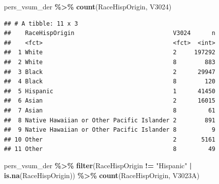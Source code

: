 \documentclass[
]{krantz}
\makeatletter
\newenvironment{Shaded}{\begin{snugshade}}{\end{snugshade}}
\newcommand{\FunctionTok}[1]{\textcolor[rgb]{0.27,0.27,0.27}{\textbf{#1}}}
\newcommand{\NormalTok}[1]{#1}
\newcommand{\SpecialCharTok}[1]{\textcolor[rgb]{0.43,0.43,0.43}{\textbf{#1}}}
\newcommand{\StringTok}[1]{\textcolor[rgb]{0.5,0.5,0.5}{#1}}
\newenvironment{kframe}{%
\medskip{}
\setlength{\fboxsep}{.8em}
 \def\at@end@of@kframe{}%
 \ifinner\ifhmode%
  \def\at@end@of@kframe{\end{minipage}}%
  \begin{minipage}{\columnwidth}%
 \fi\fi%
 \def\FrameCommand##1{\hskip\@totalleftmargin \hskip-\fboxsep
 \colorbox{shadecolor}{##1}\hskip-\fboxsep
     \hskip-\linewidth \hskip-\@totalleftmargin \hskip\columnwidth}%
 \MakeFramed {\advance\hsize-\width
   \@totalleftmargin\z@ \linewidth\hsize
   \@setminipage}}%
 {\par\unskip\endMakeFramed%
 \at@end@of@kframe}
\renewenvironment{Shaded}{\begin{kframe}}{\end{kframe}}
\makeatother
\begin{document}
\begin{Shaded}
\begin{Highlighting}[]
\NormalTok{pers\_vsum\_der }\SpecialCharTok{\%\textgreater{}\%} \FunctionTok{count}\NormalTok{(RaceHispOrigin, V3024)}
\end{Highlighting}
\end{Shaded}

\begin{verbatim}
## # A tibble: 11 x 3
##    RaceHispOrigin                            V3024      n
##    <fct>                                     <fct>  <int>
##  1 White                                     2     197292
##  2 White                                     8        883
##  3 Black                                     2      29947
##  4 Black                                     8        120
##  5 Hispanic                                  1      41450
##  6 Asian                                     2      16015
##  7 Asian                                     8         61
##  8 Native Hawaiian or Other Pacific Islander 2        891
##  9 Native Hawaiian or Other Pacific Islander 8          9
## 10 Other                                     2       5161
## 11 Other                                     8         49
\end{verbatim}

\begin{Shaded}
\begin{Highlighting}[]
\NormalTok{pers\_vsum\_der }\SpecialCharTok{\%\textgreater{}\%}
  \FunctionTok{filter}\NormalTok{(RaceHispOrigin }\SpecialCharTok{!=} \StringTok{"Hispanic"} \SpecialCharTok{|}
    \FunctionTok{is.na}\NormalTok{(RaceHispOrigin)) }\SpecialCharTok{\%\textgreater{}\%}
  \FunctionTok{count}\NormalTok{(RaceHispOrigin, V3023A)}
\end{Highlighting}
\end{Shaded}
\end{document}
